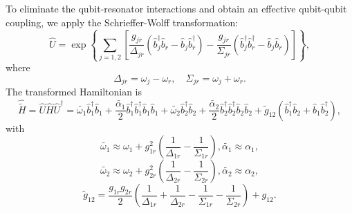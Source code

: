 \documentclass[reprint,superscriptaddress,preprintnumbers,longbibliography,
amsmath,amssymb,aps,floatfix,pra,twocolumn, tightenlines %
]{revtex4-2}
\begin{document}
To eliminate the qubit-resonator interactions and obtain an effective qubit-qubit coupling, we apply the Schrieffer-Wolff transformation:
\begin{equation}
\hat{U} = \exp \left\{ \sum_{j=1,2} \left[ \frac{g_{jr}}{\Delta_{jr}} \left( \hat{b}_j^\dagger \hat{b}_r - \hat{b}_j \hat{b}_r^\dagger \right) - \frac{g_{jr}}{\Sigma_{jr}} \left( \hat{b}_j^\dagger \hat{b}_r^\dagger - \hat{b}_j \hat{b}_r \right) \right] \right\},
\end{equation}
where
\begin{equation}
\Delta_{jr} = \omega_j - \omega_r, \quad \Sigma_{jr} = \omega_j + \omega_r. 
\end{equation}
The transformed Hamiltonian is
\begin{equation}
\hat{\widetilde{H}} = \hat{U} \hat{H} \hat{U}^\dagger = \widetilde{\omega_1} \hat{b}_1^\dagger \hat{b}_1 + \frac{\widetilde{\alpha_1}}{2} \hat{b}_1^\dagger \hat{b}_1^\dagger \hat{b}_1 \hat{b}_1 + \widetilde{\omega_2} \hat{b}_2^\dagger \hat{b}_2 + \frac{\widetilde{\alpha_2}}{2} \hat{b}_2^\dagger \hat{b}_2^\dagger \hat{b}_2 \hat{b}_2 + \widetilde{g}_{12} \left( \hat{b}_1^\dagger \hat{b}_2 + \hat{b}_1 \hat{b}_2^\dagger \right),
\end{equation}
with
\begin{equation}
\widetilde{\omega_1} \approx \omega_1 + g_{1r}^2 \left( \frac{1}{\Delta_{1r}} - \frac{1}{\Sigma_{1r}} \right), \widetilde{\alpha_1} \approx \alpha_1,
\end{equation}
\begin{equation}
\widetilde{\omega_2} \approx \omega_2 + g_{2r}^2 \left( \frac{1}{\Delta_{2r}} - \frac{1}{\Sigma_{2r}} \right),  \widetilde{\alpha_2} \approx \alpha_2,
\end{equation}
\begin{equation}
\widetilde{g}_{12} = \frac{g_{1r} g_{2r}}{2} \left( \frac{1}{\Delta_{1r}} + \frac{1}{\Delta_{2r}} - \frac{1}{\Sigma_{1r}} - \frac{1}{\Sigma_{2r}} \right) + g_{12}.
\end{equation}
\end{document}
